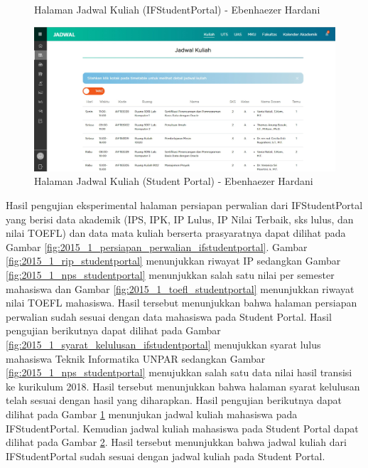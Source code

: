 \begin{itemize}
\begin{enumerate}
\begin{figure}[H]
			\caption{Halaman Jadwal Kuliah (IFStudentPortal) - Ebenhaezer Hardani}
			\label{fig:2015_1_jadwal_kuliah_ifstudentportal}
		\end{figure}
		\begin{figure}[H]
			\centering
			\includegraphics[scale=0.45]{Gambar/HasilPengujian/2015_1_jadwal_kuliah_studentportal}
			\caption{Halaman Jadwal Kuliah (Student Portal) - Ebenhaezer Hardani}
			\label{fig:2015_1_jadwal_kuliah_studentportal}
		\end{figure}
		Hasil pengujian eksperimental halaman persiapan perwalian dari IFStudentPortal yang berisi data akademik (IPS, IPK, IP Lulus, IP Nilai Terbaik, sks lulus, dan nilai TOEFL) dan data mata kuliah berserta prasyaratnya dapat dilihat pada Gambar \ref{fig:2015_1_persiapan_perwalian_ifstudentportal}. Gambar \ref{fig:2015_1_rip_studentportal} menunjukkan riwayat IP sedangkan Gambar \ref{fig:2015_1_nps_studentportal} menunjukkan salah satu nilai per semester mahasiswa dan Gambar \ref{fig:2015_1_toefl_studentportal} menunjukkan riwayat nilai TOEFL mahasiswa. Hasil tersebut menunjukkan bahwa halaman persiapan perwalian sudah sesuai dengan data mahasiswa pada Student Portal. Hasil pengujian berikutnya dapat dilihat pada Gambar \ref{fig:2015_1_syarat_kelulusan_ifstudentportal} menujukkan syarat lulus mahasiswa Teknik Informatika UNPAR sedangkan Gambar \ref{fig:2015_1_nps_studentportal} menujukkan salah satu data nilai hasil transisi ke kurikulum 2018. Hasil tersebut menunjukkan bahwa halaman syarat kelulusan telah sesuai dengan hasil yang diharapkan. Hasil pengujian berikutnya dapat dilihat pada Gambar \ref{fig:2015_1_jadwal_kuliah_ifstudentportal} menunjukan jadwal kuliah mahasiswa pada IFStudentPortal. Kemudian jadwal kuliah mahasiswa pada Student Portal dapat dilihat pada Gambar \ref{fig:2015_1_jadwal_kuliah_studentportal}. Hasil tersebut menunjukkan bahwa jadwal kuliah dari IFStudentPortal sudah sesuai dengan jadwal kuliah pada Student Portal.

\end{enumerate}
\end{itemize}
